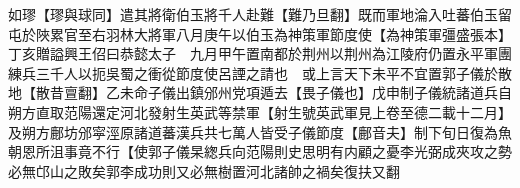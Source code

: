 如璆【璆與球同】遣其將衛伯玉將千人赴難【難乃旦翻】既而軍地淪入吐蕃伯玉留屯於陜累官至右羽林大將軍八月庚午以伯玉為神策軍節度使【為神策軍彊盛張本】　丁亥贈謚興王佋曰恭懿太子　九月甲午置南都於荆州以荆州為江陵府仍置永平軍團練兵三千人以扼吳蜀之衝從節度使呂諲之請也　或上言天下未平不宜置郭子儀於散地【散昔亶翻】乙未命子儀出鎮邠州党項遁去【畏子儀也】戊申制子儀統諸道兵自朔方直取范陽還定河北發射生英武等禁軍【射生號英武軍見上卷至德二載十二月】及朔方鄜坊邠寜涇原諸道蕃漢兵共七萬人皆受子儀節度【鄜音夫】制下旬日復為魚朝恩所沮事竟不行【使郭子儀杲緫兵向范陽則史思明有内顧之憂李光弼成夾攻之勢必無邙山之敗矣郭李成功則又必無樹置河北諸帥之禍矣復扶又翻
